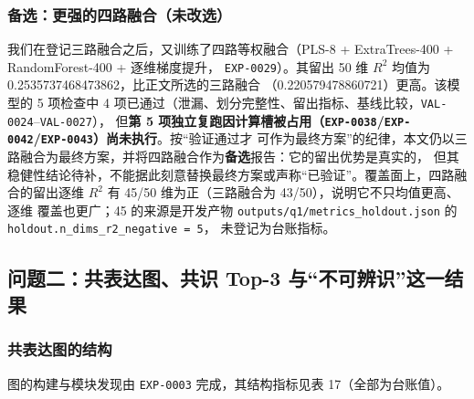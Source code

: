 \documentclass[
  a4paper,12pt]{article}
\begin{document}
\subsubsection{备选：更强的四路融合（未改选）}\label{ux5907ux9009ux66f4ux5f3aux7684ux56dbux8defux878dux5408ux672aux6539ux9009}

我们在登记三路融合之后，又训练了四路等权融合（PLS-8 + ExtraTrees-400 +
RandomForest-400 + 逐维梯度提升， \texttt{EXP-0029}）。其留出 50 维
\(R^2\) 均值为 0.2535737468473862，比正文所选的三路融合
（0.220579478860721）更高。该模型的 5 项检查中 4
项已通过（泄漏、划分完整性、留出指标、基线比较，\texttt{VAL-0024}--\texttt{VAL-0027}），
但\textbf{第 5
项独立复跑因计算槽被占用（\texttt{EXP-0038}/\texttt{EXP-0042}/\texttt{EXP-0043}）尚未执行}。按``验证通过才
可作为最终方案''的纪律，本文仍以三路融合为最终方案，并将四路融合作为\textbf{备选}报告：它的留出优势是真实的，
但其稳健性结论待补，不能据此刻意替换最终方案或声称``已验证''。覆盖面上，四路融合的留出逐维
\(R^2\) 有 45/50 维为正（三路融合为 43/50），说明它不只均值更高、逐维
覆盖也更广；45 的来源是开发产物
\texttt{outputs/q1/metrics\_holdout.json} 的
\texttt{holdout.n\_dims\_r2\_negative\ =\ 5}， 未登记为台账指标。

\subsection{问题二：共表达图、共识 Top-3
与``不可辨识''这一结果}\label{ux95eeux9898ux4e8cux5171ux8868ux8fbeux56feux5171ux8bc6-top-3-ux4e0eux4e0dux53efux8fa8ux8bc6ux8fd9ux4e00ux7ed3ux679c}

\subsubsection{共表达图的结构}\label{ux5171ux8868ux8fbeux56feux7684ux7ed3ux6784}

图的构建与模块发现由 \texttt{EXP-0003} 完成，其结构指标见表
17（全部为台账值）。
\end{document}
